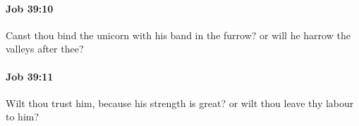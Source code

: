 		\paragraph{Job 39:10} %
			\label{JOB-39-10}

			Canst thou bind the unicorn with his band in the furrow? or will he harrow the valleys after thee?


		\paragraph{Job 39:11} %
			\label{JOB-39-11}

			Wilt thou trust him, because his strength is great? or wilt thou leave thy labour to him?


